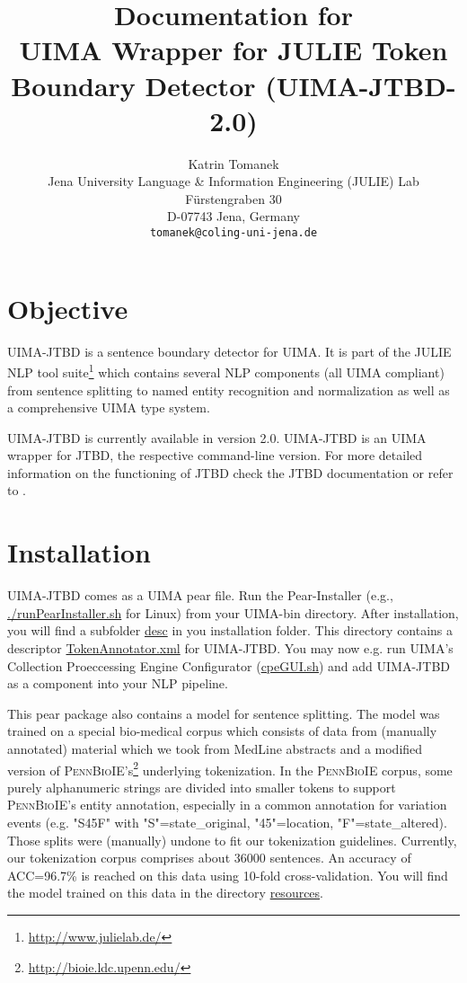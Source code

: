 \documentclass[11pt,a4paper,halfparskip]{scrartcl}
\title{\small{Documentation for}\\\huge UIMA Wrapper for JULIE Token Boundary Detector
  (UIMA-JTBD-2.0)}
\author{\normalsize Katrin Tomanek\\
  \normalsize  Jena University Language \& Information Engineering (JULIE) Lab\\
  \normalsize F\"urstengraben 30 \\
  \normalsize D-07743 Jena, Germany\\
  {\normalsize \tt tomanek@coling-uni-jena.de} }
\date{}
\begin{document}
\maketitle

\section{Objective}

UIMA-JTBD is a sentence boundary detector for UIMA.  It is part of
the JULIE NLP tool suite\footnote{\url{http://www.julielab.de/}} which
contains several NLP components (all UIMA compliant) from sentence
splitting to named entity recognition and normalization as well as a
comprehensive UIMA type system.

UIMA-JTBD is currently available in version 2.0. UIMA-JTBD is an UIMA
wrapper for JTBD, the respective command-line version. For more
detailed information on the functioning of JTBD check the JTBD
documentation or refer to \cite{Tomanek2007a}.

\section{Installation}

UIMA-JTBD comes as a UIMA pear file. Run the Pear-Installer (e.g.,
\url{./runPearInstaller.sh} for Linux) from your UIMA-bin directory.
After installation, you will find a subfolder \url{desc} in you
installation folder. This directory contains a descriptor
\url{TokenAnnotator.xml} for UIMA-JTBD. You may now e.g. run UIMA's
Collection Proeccessing Engine Configurator (\url{cpeGUI.sh}) and add
UIMA-JTBD as a component into your NLP pipeline.

This pear package also contains a model for sentence splitting. The
model was trained on a special bio-medical corpus which consists of data from (manually
annotated) material which we took from MedLine abstracts and a
modified version of
\textsc{PennBioIE}'s\footnote{\url{http://bioie.ldc.upenn.edu/}}
underlying tokenization. In the \textsc{PennBioIE} corpus, some purely
alphanumeric strings are divided into smaller tokens to support
\textsc{PennBioIE}'s entity annotation, especially in a common
annotation for variation events (e.g.  "S45F" with "S"=state\_original,
"45"=location, "F"=state\_altered).  Those splits were (manually)
undone to fit our tokenization guidelines.
Currently, our tokenization corpus comprises about 36000 sentences.
An accuracy of ACC=96.7\% is reached on this data using 10-fold
cross-validation.  You will find the model trained on this data in the
directory \url{resources}.
\end{document}
